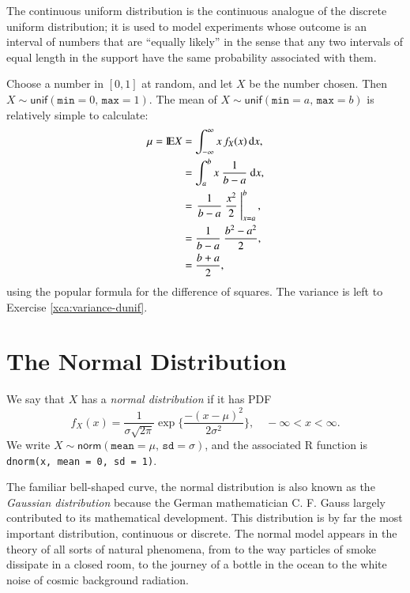 \documentclass[captions=tableheading]{scrbook}
\begin{document}
The continuous uniform distribution is the continuous analogue of the discrete uniform distribution; it is used to model experiments whose outcome is an interval of numbers that are ``equally likely'' in the sense that any two intervals of equal length in the support have the same probability associated with them.

\begin{example}
Choose a number in \( [0,1] \) at random, and let \(X\) be the number chosen. Then \(X\sim\mathsf{unif}(\mathtt{min}=0,\,\mathtt{max}=1)\).
The mean of \(X\sim\mathsf{unif}(\mathtt{min}=a,\,\mathtt{max}=b)\) is relatively simple to calculate:
\begin{align*}
\mu=\mathrm{I\hspace{-1.5pt}E} X & =\int_{-\infty}^{\infty}x\, f_{X}(x)\,\mathrm{d} x,\\
 & =\int_{a}^{b}x\ \frac{1}{b-a}\ \mathrm{d} x,\\
 & =\left.\frac{1}{b-a}\ \frac{x^{2}}{2}\ \right|_{x=a}^{b},\\
 & =\frac{1}{b-a}\ \frac{b^{2}-a^{2}}{2},\\
 & =\frac{b+a}{2},
\end{align*}
using the popular formula for the difference of squares. The variance is left to Exercise \ref{xca:variance-dunif}.
\end{example}
\section{The Normal Distribution}
\label{sec-6-3}

\label{sec:The-Normal-Distribution}

We say that \(X\) has a \emph{normal distribution} if it has PDF
\begin{equation}
f_{X}(x)=\frac{1}{\sigma\sqrt{2\pi}}\exp \{ \frac{-(x-\mu)^{2}}{2\sigma^{2}} \} ,\quad-\infty<x<\infty.
\end{equation}
We write \(X\sim\mathsf{norm}(\mathtt{mean}=\mu,\,\mathtt{sd}=\sigma)\), and the associated \textsf{R} function is \texttt{dnorm(x, mean = 0, sd = 1)}.

The familiar bell-shaped curve, the normal distribution is also known as the \emph{Gaussian distribution} because the German mathematician C. F. Gauss largely contributed to its mathematical development. This distribution is by far the most important distribution, continuous or discrete. The normal model appears in the theory of all sorts of natural phenomena, from to the way particles of smoke dissipate in a closed room, to the journey of a bottle in the ocean to the white noise of cosmic background radiation.
\end{document}
